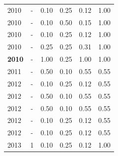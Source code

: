 \begin{table}[H]
\begin{tabular}{| l | c | c | c | c | c |}
\hline
            2010
          &
          -
          &
          0.10
          &
          0.25
          &
          0.12
          &
            {\color{blue} 1.00}
          \\
            2010
          &
          -
          &
          0.10
          &
          0.50
          &
          0.15
          &
            {\color{blue} 1.00}
          \\
            2010
          &
          -
          &
          0.10
          &
          0.25
          &
          0.12
          &
            {\color{blue} 1.00}
          \\
            2010
          &
          -
          &
          0.25
          &
          0.25
          &
          0.31
          &
            {\color{blue} 1.00}
          \\
            {\bf 2010}
          &
          -
          &
          1.00
          &
          0.25
          &
          1.00
          &
            {\color{blue} 1.00}
          \\
\hline
            2011
          &
          -
          &
          0.50
          &
          0.10
          &
          0.55
          &
            {\color{blue} 0.55}
          \\
\hline
            2012
          &
          -
          &
          0.10
          &
          0.25
          &
          0.12
          &
            {\color{blue} 0.55}
          \\
            2012
          &
          -
          &
          0.50
          &
          0.10
          &
          0.55
          &
            {\color{blue} 0.55}
          \\
            2012
          &
          -
          &
          0.50
          &
          0.10
          &
          0.55
          &
            {\color{blue} 0.55}
          \\
            2012
          &
          -
          &
          0.10
          &
          0.25
          &
          0.12
          &
            {\color{blue} 0.55}
          \\
            2012
          &
          -
          &
          0.10
          &
          0.25
          &
          0.12
          &
            {\color{blue} 0.55}
          \\
\hline
            2013
          &
          1
          &
          0.10
          &
          0.25
          &
          0.12
          &
            {\color{blue} 1.00}

\end{tabular}
\end{table}
